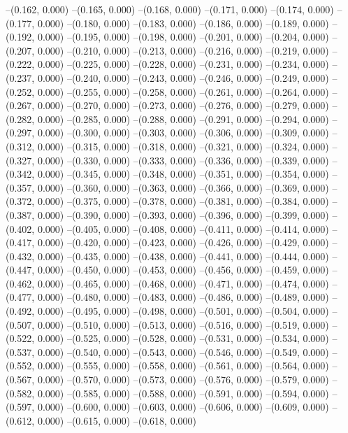 --(0.162, 0.000)
--(0.165, 0.000)
--(0.168, 0.000)
--(0.171, 0.000)
--(0.174, 0.000)
--(0.177, 0.000)
--(0.180, 0.000)
--(0.183, 0.000)
--(0.186, 0.000)
--(0.189, 0.000)
--(0.192, 0.000)
--(0.195, 0.000)
--(0.198, 0.000)
--(0.201, 0.000)
--(0.204, 0.000)
--(0.207, 0.000)
--(0.210, 0.000)
--(0.213, 0.000)
--(0.216, 0.000)
--(0.219, 0.000)
--(0.222, 0.000)
--(0.225, 0.000)
--(0.228, 0.000)
--(0.231, 0.000)
--(0.234, 0.000)
--(0.237, 0.000)
--(0.240, 0.000)
--(0.243, 0.000)
--(0.246, 0.000)
--(0.249, 0.000)
--(0.252, 0.000)
--(0.255, 0.000)
--(0.258, 0.000)
--(0.261, 0.000)
--(0.264, 0.000)
--(0.267, 0.000)
--(0.270, 0.000)
--(0.273, 0.000)
--(0.276, 0.000)
--(0.279, 0.000)
--(0.282, 0.000)
--(0.285, 0.000)
--(0.288, 0.000)
--(0.291, 0.000)
--(0.294, 0.000)
--(0.297, 0.000)
--(0.300, 0.000)
--(0.303, 0.000)
--(0.306, 0.000)
--(0.309, 0.000)
--(0.312, 0.000)
--(0.315, 0.000)
--(0.318, 0.000)
--(0.321, 0.000)
--(0.324, 0.000)
--(0.327, 0.000)
--(0.330, 0.000)
--(0.333, 0.000)
--(0.336, 0.000)
--(0.339, 0.000)
--(0.342, 0.000)
--(0.345, 0.000)
--(0.348, 0.000)
--(0.351, 0.000)
--(0.354, 0.000)
--(0.357, 0.000)
--(0.360, 0.000)
--(0.363, 0.000)
--(0.366, 0.000)
--(0.369, 0.000)
--(0.372, 0.000)
--(0.375, 0.000)
--(0.378, 0.000)
--(0.381, 0.000)
--(0.384, 0.000)
--(0.387, 0.000)
--(0.390, 0.000)
--(0.393, 0.000)
--(0.396, 0.000)
--(0.399, 0.000)
--(0.402, 0.000)
--(0.405, 0.000)
--(0.408, 0.000)
--(0.411, 0.000)
--(0.414, 0.000)
--(0.417, 0.000)
--(0.420, 0.000)
--(0.423, 0.000)
--(0.426, 0.000)
--(0.429, 0.000)
--(0.432, 0.000)
--(0.435, 0.000)
--(0.438, 0.000)
--(0.441, 0.000)
--(0.444, 0.000)
--(0.447, 0.000)
--(0.450, 0.000)
--(0.453, 0.000)
--(0.456, 0.000)
--(0.459, 0.000)
--(0.462, 0.000)
--(0.465, 0.000)
--(0.468, 0.000)
--(0.471, 0.000)
--(0.474, 0.000)
--(0.477, 0.000)
--(0.480, 0.000)
--(0.483, 0.000)
--(0.486, 0.000)
--(0.489, 0.000)
--(0.492, 0.000)
--(0.495, 0.000)
--(0.498, 0.000)
--(0.501, 0.000)
--(0.504, 0.000)
--(0.507, 0.000)
--(0.510, 0.000)
--(0.513, 0.000)
--(0.516, 0.000)
--(0.519, 0.000)
--(0.522, 0.000)
--(0.525, 0.000)
--(0.528, 0.000)
--(0.531, 0.000)
--(0.534, 0.000)
--(0.537, 0.000)
--(0.540, 0.000)
--(0.543, 0.000)
--(0.546, 0.000)
--(0.549, 0.000)
--(0.552, 0.000)
--(0.555, 0.000)
--(0.558, 0.000)
--(0.561, 0.000)
--(0.564, 0.000)
--(0.567, 0.000)
--(0.570, 0.000)
--(0.573, 0.000)
--(0.576, 0.000)
--(0.579, 0.000)
--(0.582, 0.000)
--(0.585, 0.000)
--(0.588, 0.000)
--(0.591, 0.000)
--(0.594, 0.000)
--(0.597, 0.000)
--(0.600, 0.000)
--(0.603, 0.000)
--(0.606, 0.000)
--(0.609, 0.000)
--(0.612, 0.000)
--(0.615, 0.000)
--(0.618, 0.000)
